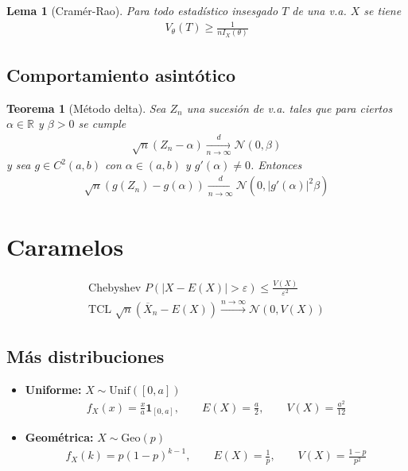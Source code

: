 \documentclass[a4paper,twocolumn]{extarticle}
\newtheorem*{thm}{Teorema}
\newtheorem*{lem}{Lema}
\theoremstyle{remark}
\newcommand{\R}{\mathbb{R}}
\newcommand{\Xbarra}{\overline{X}}
\newcommand{\normal}{\mathcal{N}}
\begin{document}
\begin{lem}[Cramér-Rao]
	Para todo estadístico insesgado $T$ de una v.a. $X$ se tiene
	\begin{align*}
		V_\theta(T) \geq \frac{1}{nI_X(\theta)}
	\end{align*}
\end{lem}

\subsection{Comportamiento asintótico}

\begin{thm}[Método delta]
	Sea $Z_n$ una sucesión de v.a. tales que para ciertos $\alpha \in \R$ y  $\beta > 0$ se cumple
	\begin{align*}
		\sqrt{n}(Z_n - \alpha)\xrightarrow[n \to \infty]{d} \normal(0, \beta)
	\end{align*}
	y sea $g \in C^2(a,b)$ con $\alpha \in (a,b)$ y $g'(\alpha) \neq 0$. Entonces
	\begin{align*}
		\sqrt{n}(g(Z_n) - g(\alpha)) \xrightarrow[n \to \infty]{d} \normal(0, |g'(\alpha)|^2\beta)
	\end{align*}
\end{thm}

\section{Caramelos}


\begin{align*}
\text{Chebyshev }P(|X - E(X)| > \varepsilon) \leq \frac{V(X)}{\varepsilon^2} \\
\text{TCL }\sqrt{n}(\Xbarra_n - E(X)) \xrightarrow{n \to \infty} \normal(0, V(X))
\end{align*}

\subsection{Más distribuciones}

\begin{itemize}
	\item \textbf{Uniforme:} $X \sim \text{Unif}([0,a])$
	\begin{align*}
		f_X(x) = \frac{x}{a}\mathbf{1}_{[0,a]},\qquad E(X) = \frac{a}{2},\qquad V(X) = \frac{a^2}{12}
	\end{align*}
	\item \textbf{Geométrica:} $X \sim \text{Geo}(p)$
	\begin{align*}
		f_X(k) = p(1-p)^{k-1},\qquad E(X) = \frac{1}{p},\qquad V(X) = \frac{1-p}{p^2}
	\end{align*}
\end{itemize}
\end{document}
